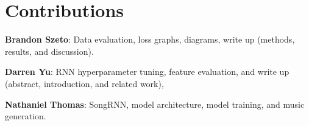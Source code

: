 \section*{Contributions}

\textbf{Brandon Szeto}: Data evaluation, loss graphs, diagrams, write up (methods, results, and discussion).

\textbf{Darren Yu}: RNN hyperparameter tuning, feature evaluation, and write up (abstract, introduction, and related work), 

\textbf{Nathaniel Thomas}: SongRNN, model architecture, model training, and music generation.
